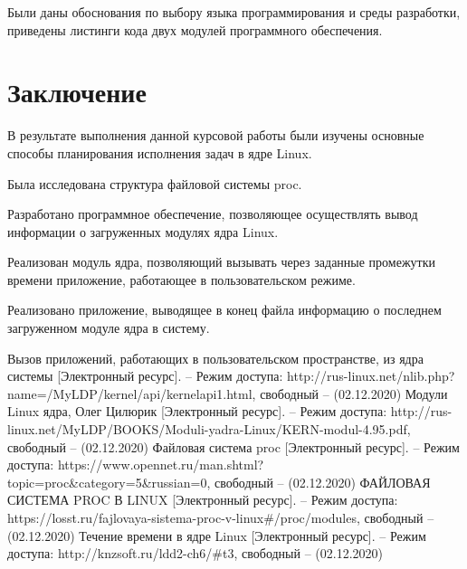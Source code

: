 \documentclass[a4paper,14pt]{extarticle}
\begin{document}
 	Были даны обоснования по выбору языка программирования и среды разработки, приведены листинги кода двух модулей программного обеспечения.
 	
 	
 	\newpage
 	\section*{Заключение}
 	
 	В результате выполнения данной курсовой работы были изучены основные способы планирования исполнения задач в ядре Linux.
 	
 	Была исследована структура файловой системы proc.
 	
 	Разработано программное обеспечение, позволяющее осуществлять вывод информации о загруженных модулях ядра Linux.
 	
 	Реализован модуль ядра, позволяющий вызывать через заданные промежутки времени приложение, работающее в пользовательском режиме.
 	
 	Реализовано приложение, выводящее в конец файла информацию о последнем загруженном модуле ядра в систему.
 	
 	
 	
 	
 	\newpage
 	
 	\begin{thebibliography}{5}
 		Вызов приложений, работающих в пользовательском пространстве, из ядра системы [Электронный ресурс]. – Режим доступа: 
 		http://rus-linux.net/nlib.php?name=/MyLDP/kernel/api/kernelapi1.html, 
 		свободный – (02.12.2020)
 		Модули Linux ядра, Олег Цилюрик [Электронный ресурс]. – Режим доступа: 
 		http://rus-linux.net/MyLDP/BOOKS/Moduli-yadra-Linux/KERN-modul-4.95.pdf, 
 		свободный – (02.12.2020)
 		Файловая система proc [Электронный ресурс]. – Режим доступа: 
 		https://www.opennet.ru/man.shtml?topic=proc\&category=5\&russian=0, 
 		свободный – (02.12.2020)
 		ФАЙЛОВАЯ СИСТЕМА PROC В LINUX [Электронный ресурс]. – Режим доступа: 
 		https://losst.ru/fajlovaya-sistema-proc-v-linux\#/proc/modules, 
 		свободный – (02.12.2020)
 		Течение времени в ядре Linux [Электронный ресурс]. – Режим доступа: 
 		http://knzsoft.ru/ldd2-ch6/\#t3, 
 		свободный – (02.12.2020)
 	\end{thebibliography}
 	
 
\end{document}
